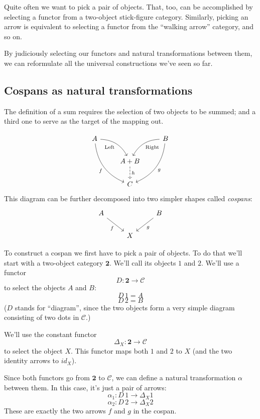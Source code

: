 \documentclass[DaoFP]{subfiles}
\begin{document}
Quite often we want to pick a pair of objects. That, too, can be accomplished by selecting a functor from a two-object stick-figure category. Similarly, picking an arrow is equivalent to selecting a functor from the ``walking arrow'' category, and so on.

By judiciously selecting our functors and natural transformations between them, we can reformulate all the universal constructions we've seen so far.

\subsection{Cospans as natural transformations}

The definition of a sum requires the selection of two objects to be summed; and a third one to serve as the target of the mapping out.

\[
 \begin{tikzcd}
 A
 \arrow[dr,  bend left, "\text{Left}"']
 \arrow[ddr, bend right, "f"']
 && B
 \arrow[dl, bend right, "\text{Right}"]
 \arrow[ddl, bend left, "g"]
 \\
&A + B
\arrow[d, dashed, "h"]
\\
& C
 \end{tikzcd}
\]
This diagram can be further decomposed into two simpler shapes called \emph{cospans}:
\[
 \begin{tikzcd}
 A
 \arrow[dr, "f"']
 && B
 \arrow[dl, "g"]
 \\
 & X
 \end{tikzcd}
\]

To construct a cospan we first have to pick a pair of objects. To do that we'll start with a two-object category $\mathbf{2}$. We'll call its objects $1$ and $2$. 
We'll use a functor 
\[ D \colon \mathbf{2} \to \mathcal{C}\]
to select the objects $A$ and $B$: 
\[D\, 1 = A\]
\[ D\, 2 = B \]
($D$ stands for ``diagram'', since the two objects form a very simple diagram consisting of two dots in $\mathcal{C}$.)

We'll use the constant functor 
\[ \Delta_X \colon \mathbf{2} \to \mathcal{C} \]
to select the object $X$. This functor maps both $1$ and $2$ to $X$ (and the two identity arrows to $id_X$).

Since both functors go from $\mathbf{2}$ to $\mathcal{C}$, we can define a natural transformation $\alpha$ between them. In this case, it's just a pair of arrows:
\[ \alpha_1 \colon D \, 1 \to \Delta_X 1 \]
\[ \alpha_2 \colon D \, 2 \to \Delta_X 2 \]
These are exactly the two arrows $f$ and $g$ in the cospan. 
\end{document}
